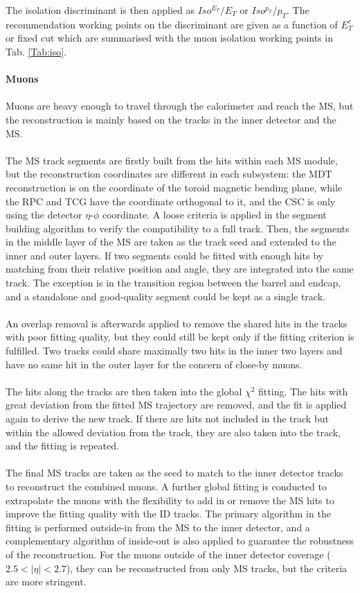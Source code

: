 The isolation discriminant is then applied as $Iso^{E_{T}}/E_{T}$ or $Iso^{p_T}/p_{T}$. The recommendation working points on the discriminant are given as a function of $E^{e}_{T}$ or fixed cut which are summarised with the muon isolation working points in Tab. \ref{Tab:iso}. 
\\
\\{\bf Muons}
\\
\\Muons are heavy enough to travel through the calorimeter and reach the MS, but the reconstruction is mainly based on the tracks in the inner detector and the MS. 
\\
\\The MS track segments are firstly built from the hits within each MS module, but the reconstruction coordinates are different in each subsystem: the MDT reconstruction is on the coordinate of the toroid magnetic bending plane, while the RPC and TCG have the coordinate orthogonal to it, and the CSC is only using the detector $\eta$-$\phi$ coordinate. A loose criteria is applied in the segment building algorithm to verify the compatibility to a full track. Then, the segments in the middle layer of the MS are taken as the track seed and extended to the inner and outer layers. If two segments could be fitted with enough hits by matching from their relative position and angle, they are integrated into the same track. The exception is in the transition region between the barrel and endcap, and a standalone and good-quality segment could be kept as a single track.  
\\
\\An overlap removal is afterwards applied to remove the shared hits in the tracks with poor fitting quality, but they could still be kept only if the fitting criterion is fulfilled. Two tracks could share maximally two hits in the inner two layers and have no same hit in the outer layer for the concern of close-by muons. 
\\
\\The hits along the tracks are then taken into the global $\chi^{2}$ fitting. The hits with great deviation from the fitted MS trajectory are removed, and the fit is applied again to derive the new track. If there are hits not included in the track but within the allowed deviation from the track, they are also taken into the track, and the fitting is repeated. 
\\
\\The final MS tracks are taken as the seed to match to the inner detector tracks to reconstruct the combined muons. A further global fitting is conducted to extrapolate the muons with the flexibility to add in or remove the MS hits to improve the fitting quality with the ID tracks. The primary algorithm in the fitting is performed outside-in from the MS to the inner detector, and a complementary algorithm of inside-out is also applied to guarantee the robustness of the reconstruction. For the muons outside of the inner detector coverage ($2.5<|\eta|<2.7$), they can be reconstructed from only MS tracks, but the criteria are more stringent. 
